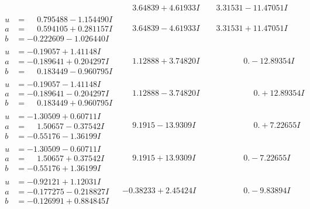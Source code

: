 \documentclass[1p]{elsarticle_modified}
\theoremstyle{definition}
\begin{document}
$$\begin{array}{c|c|c}
 & \phantom{-}3.64839 + 4.61933 I & \phantom{-}3.31531 - 11.47051 I \\ \hline\begin{aligned}
u &= \phantom{-}0.795488 - 1.154490 I \\
a &= \phantom{-}0.594105 + 0.281157 I \\
b &= -0.222609 - 1.026440 I\end{aligned}
 & \phantom{-}3.64839 - 4.61933 I & \phantom{-}3.31531 + 11.47051 I \\ \hline\begin{aligned}
u &= -0.19057 + 1.41148 I \\
a &= -0.189641 + 0.204297 I \\
b &= \phantom{-}0.183449 - 0.960795 I\end{aligned}
 & \phantom{-}1.12888 + 3.74820 I & \phantom{-0.000000 } 0. - 12.89354 I \\ \hline\begin{aligned}
u &= -0.19057 - 1.41148 I \\
a &= -0.189641 - 0.204297 I \\
b &= \phantom{-}0.183449 + 0.960795 I\end{aligned}
 & \phantom{-}1.12888 - 3.74820 I & \phantom{-0.000000 -}0. + 12.89354 I \\ \hline\begin{aligned}
u &= -1.30509 + 0.60711 I \\
a &= \phantom{-}1.50657 - 0.37542 I \\
b &= -0.55176 - 1.36199 I\end{aligned}
 & \phantom{-}9.1915 - 13.9309 I & \phantom{-0.000000 -}0. + 7.22655 I \\ \hline\begin{aligned}
u &= -1.30509 - 0.60711 I \\
a &= \phantom{-}1.50657 + 0.37542 I \\
b &= -0.55176 + 1.36199 I\end{aligned}
 & \phantom{-}9.1915 + 13.9309 I & \phantom{-0.000000 } 0. - 7.22655 I \\ \hline\begin{aligned}
u &= -0.92121 + 1.12031 I \\
a &= -0.177275 - 0.218827 I \\
b &= -0.126991 + 0.884845 I\end{aligned}
 & -0.38233 + 2.45424 I & \phantom{-0.000000 } 0. - 9.83894 I \\ \hline\begin{aligned}

\end{aligned}
\end{array}$$
\end{document}

